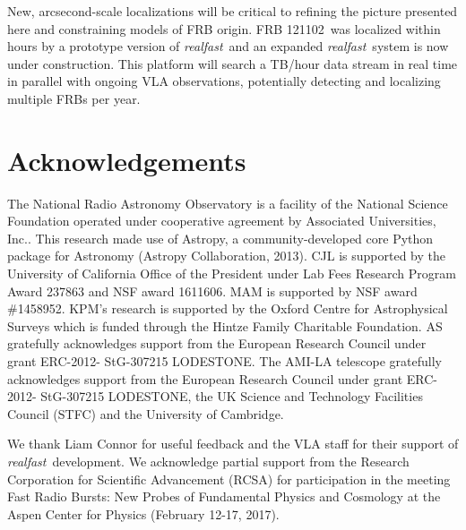 \documentclass[twocolumn]{aastex61}
\newcommand{\rf}{\emph{realfast}}
\newcommand{\frb}{FRB 121102}
\begin{document}
New, arcsecond-scale localizations will be critical to refining the picture presented here and constraining models of FRB origin. \frb\ was localized within hours by a prototype version of \rf\ and an expanded \rf\ system is now under construction. This platform will search a TB/hour data stream in real time in parallel with ongoing VLA observations, potentially detecting and localizing multiple FRBs per year.



\section*{Acknowledgements}
The National Radio Astronomy Observatory is a facility of the National Science Foundation operated under cooperative agreement by Associated Universities, Inc..
This research made use of Astropy, a community-developed core Python package for Astronomy (Astropy Collaboration, 2013).
CJL is supported by the University of California Office of the President under Lab Fees Research Program Award 237863 and NSF award 1611606. MAM is supported by NSF award \#1458952. KPM's research is supported by the Oxford Centre for Astrophysical Surveys which is funded through the Hintze Family Charitable Foundation. AS gratefully acknowledges support from the European Research Council under grant ERC-2012- StG-307215 LODESTONE. The AMI-LA telescope gratefully acknowledges support from the European Research Council under grant ERC-2012- StG-307215 LODESTONE, the UK Science and Technology Facilities Council (STFC) and the University of Cambridge.

We thank Liam Connor for useful feedback and the VLA staff for their support of \rf\ development. We acknowledge partial support from the Research Corporation for Scientific Advancement (RCSA) for participation in the meeting Fast Radio Bursts: New Probes of Fundamental Physics and Cosmology at the Aspen Center for Physics (February 12-17, 2017).


\end{document}

